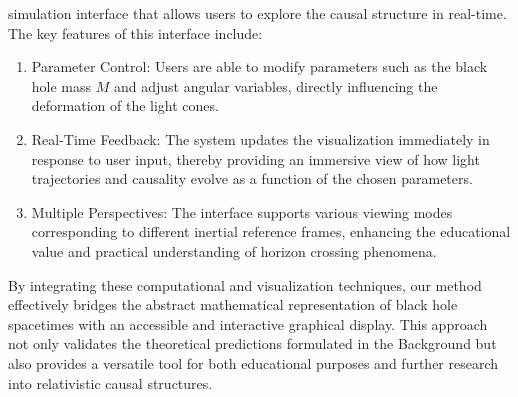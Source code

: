 \documentclass{article}
\begin{document}
simulation interface that allows users to explore the causal structure in real-time. The key features of this interface include:\n \begin{enumerate}\n   \item Parameter Control: Users are able to modify parameters such as the black hole mass $M$ and adjust angular variables, directly influencing the deformation of the light cones.\n   \item Real-Time Feedback: The system updates the visualization immediately in response to user input, thereby providing an immersive view of how light trajectories and causality evolve as a function of the chosen parameters.\n   \item Multiple Perspectives: The interface supports various viewing modes corresponding to different inertial reference frames, enhancing the educational value and practical understanding of horizon crossing phenomena.\n \end{enumerate}\n \n By integrating these computational and visualization techniques, our method effectively bridges the abstract mathematical representation of black hole spacetimes with an accessible and interactive graphical display. This approach not only validates the theoretical predictions formulated in the Background but also provides a versatile tool for both educational purposes and further research into relativistic causal structures.
\end{document}
